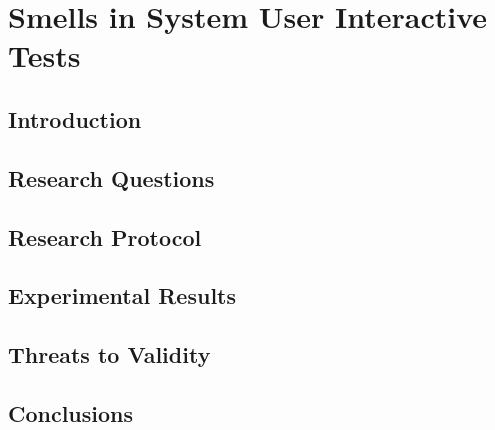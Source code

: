 \chapter{Smells in System User Interactive Tests}
\section{Introduction}
\section{Research Questions}
\section{Research Protocol}
\section{Experimental Results}
\section{Threats to Validity}
\section{Conclusions}